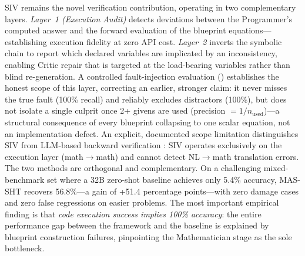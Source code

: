 \documentclass[11pt,a4paper]{article}
\begin{document}
SIV remains the novel verification contribution, operating in two complementary layers.
\emph{Layer~1 (Execution Audit)} detects deviations between the Programmer's computed answer and the forward evaluation of the blueprint equations---establishing execution fidelity at zero API cost.
\emph{Layer~2} inverts the symbolic chain to report which declared variables are implicated by an inconsistency, enabling Critic repair that is targeted at the load-bearing variables rather than blind re-generation.
A controlled fault-injection evaluation () establishes the honest scope of this layer, correcting an earlier, stronger claim: it never misses the true fault (100\% recall) and reliably excludes distractors (100\%), but does not isolate a single culprit once 2+ givens are used (precision $=1/n_{\text{used}}$)---a structural consequence of every blueprint collapsing to one scalar equation, not an implementation defect.
An explicit, documented scope limitation distinguishes SIV from LLM-based backward verification \citep{jiang2024fobar}: SIV operates exclusively on the execution layer (math$\to$math) and cannot detect NL$\to$math translation errors. The two methods are orthogonal and complementary.
On a challenging mixed-benchmark set where a 32B zero-shot baseline achieves only 5.4\% accuracy, MAS-SHT recovers 56.8\%---a gain of +51.4 percentage points---with zero damage cases and zero false regressions on easier problems.
The most important empirical finding is that \emph{code execution success implies 100\% accuracy}: the entire performance gap between the framework and the baseline is explained by blueprint construction failures, pinpointing the Mathematician stage as the sole bottleneck.
\end{document}
